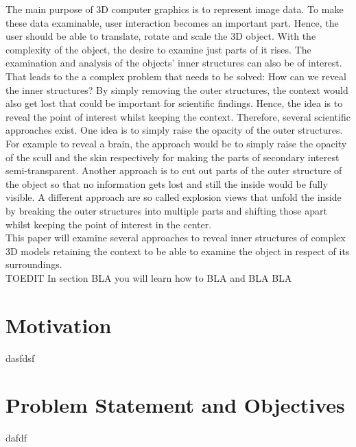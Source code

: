 

The main purpose of 3D computer graphics is to represent image data. To make these data examinable, user interaction becomes an important part. Hence, the user should be able to translate, rotate and scale the 3D object. With the complexity of the object, the desire to examine just parts of it rises. The examination and analysis of the objects' inner structures can also be of interest. That leads to the a complex problem that needs to be solved: How can we reveal the inner structures? By simply removing the outer structures, the context would also get lost that could be important for scientific findings. Hence, the idea is to reveal the point of interest whilst keeping the context. Therefore, several scientific approaches exist. One idea is to simply raise the opacity of the outer structures. For example to reveal a brain, the approach would be to simply raise the opacity of the scull and the skin respectively for making the parts of secondary interest semi-transparent. Another approach is to cut out parts of the outer structure of the object so that no information gets lost and still the inside would be fully visible. A different approach are so called explosion views that unfold the inside by breaking the outer structures into multiple parts and shifting those apart whilst keeping the point of interest in the center.\\

This paper will examine several approaches to reveal inner structures of complex 3D models retaining the context to be able to examine the object in respect of its surroundings.\\
TOEDIT In section BLA you will learn how to BLA and BLA BLA

\section{Motivation}
dasfdsf

\section{Problem Statement and Objectives}
dafdf
